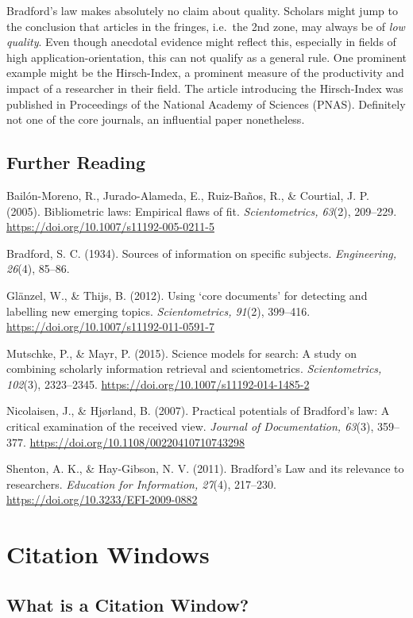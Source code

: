 \documentclass[
  letterpaper,
]{scrreprt}
\begin{document}
Bradford's law makes absolutely no claim about quality. Scholars might
jump to the conclusion that articles in the fringes, i.e.~the 2nd zone,
may always be of \emph{low quality}. Even though anecdotal evidence
might reflect this, especially in fields of high
application-orientation, this can not qualify as a general rule. One
prominent example might be the Hirsch-Index, a prominent measure of the
productivity and impact of a researcher in their field. The article
introducing the Hirsch-Index was published in Proceedings of the
National Academy of Sciences (PNAS). Definitely not one of the core
journals, an influential paper nonetheless.

\section{Further Reading}\label{further-reading}

Bailón-Moreno, R., Jurado-Alameda, E., Ruiz-Baños, R., \& Courtial, J.
P. (2005). Bibliometric laws: Empirical flaws of fit.
\emph{Scientometrics, 63}(2), 209--229.
\url{https://doi.org/10.1007/s11192-005-0211-5}

Bradford, S. C. (1934). Sources of information on specific subjects.
\emph{Engineering, 26}(4), 85--86.

Glänzel, W., \& Thijs, B. (2012). Using `core documents' for detecting
and labelling new emerging topics. \emph{Scientometrics, 91}(2),
399--416. \url{https://doi.org/10.1007/s11192-011-0591-7}

Mutschke, P., \& Mayr, P. (2015). Science models for search: A study on
combining scholarly information retrieval and scientometrics.
\emph{Scientometrics, 102}(3), 2323--2345.
\url{https://doi.org/10.1007/s11192-014-1485-2}

Nicolaisen, J., \& Hjørland, B. (2007). Practical potentials of
Bradford's law: A critical examination of the received view.
\emph{Journal of Documentation, 63}(3), 359--377.
\url{https://doi.org/10.1108/00220410710743298}

Shenton, A. K., \& Hay-Gibson, N. V. (2011). Bradford's Law and its
relevance to researchers. \emph{Education for Information, 27}(4),
217--230. \url{https://doi.org/10.3233/EFI-2009-0882}

\chapter{Citation Windows}\label{citation-windows}

\section{What is a Citation Window?}\label{what-is-a-citation-window}
\end{document}
